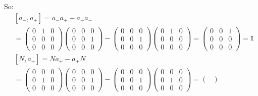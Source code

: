 \documentclass[]{ctexart}
\begin{document}
		So:
			\begin{equation*}
			\begin{aligned}
				&\left[a_-,a_+\right]=a_-a_+-a_+a_-\\
				&=
				\begin{pmatrix}
					0 & 1 & 0 \\
					0 & 0 & 0 \\
					0 & 0 & 0
				\end{pmatrix}
				\begin{pmatrix}
					0 & 0 & 0 \\
					0 & 0 & 1 \\
					0 & 0 & 0
				\end{pmatrix}
				-
				\begin{pmatrix}
					0 & 0 & 0 \\
					0 & 0 & 1 \\
					0 & 0 & 0
				\end{pmatrix}
				\begin{pmatrix}
				0 & 1 & 0 \\
				0 & 0 & 0 \\
				0 & 0 & 0
				\end{pmatrix}
				=
				\begin{pmatrix}
				0 & 0 & 1 \\
				0 & 0 & 0 \\
				0 & 0 & 0
				\end{pmatrix}=\mathds{1}\\
			&\left[N,a_+\right]=Na_+-a_+N\\
			&=
			\begin{pmatrix}
				0 & 0 & 0 \\
				0 & 1 & 0 \\
				0 & 0 & 0
			\end{pmatrix}
			\begin{pmatrix}
				0 & 0 & 0 \\
				0 & 0 & 1 \\
				0 & 0 & 0
			\end{pmatrix}
			-
			\begin{pmatrix}
				0 & 0 & 0 \\
				0 & 0 & 1 \\
				0 & 0 & 0
			\end{pmatrix}
			\begin{pmatrix}
				0 & 0 & 0 \\
				0 & 1 & 0 \\
				0 & 0 & 0
			\end{pmatrix}
			=
			\begin{pmatrix}

\end{pmatrix}
\end{aligned}
\end{equation*}
\end{document}

